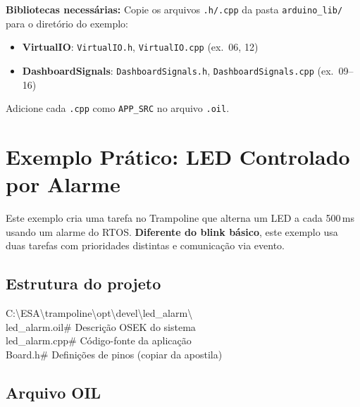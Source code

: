 \documentclass[12pt,a4paper]{article}
\begin{document}
\textbf{Bibliotecas necessárias:} Copie os arquivos \texttt{.h/.cpp} da pasta \texttt{arduino\_lib/} para o diretório do exemplo:
\begin{itemize}[nosep]
  \item \textbf{VirtualIO}: \texttt{VirtualIO.h}, \texttt{VirtualIO.cpp} (ex.~06, 12)
  \item \textbf{DashboardSignals}: \texttt{DashboardSignals.h}, \texttt{DashboardSignals.cpp} (ex.~09--16)
\end{itemize}
Adicione cada \texttt{.cpp} como \texttt{APP\_SRC} no arquivo \texttt{.oil}.

\section{Exemplo Prático: LED Controlado por Alarme}

Este exemplo cria uma tarefa no Trampoline que alterna um LED a cada 500\,ms usando um alarme do RTOS. \textbf{Diferente do blink básico}, este exemplo usa duas tarefas com prioridades distintas e comunicação via evento.

\subsection{Estrutura do projeto}

\begin{codigobox}
C:\textbackslash ESA\textbackslash trampoline\textbackslash opt\textbackslash devel\textbackslash led\_alarm\textbackslash\\
\quad led\_alarm.oil\quad\# Descrição OSEK do sistema\\
\quad led\_alarm.cpp\quad\# Código-fonte da aplicação\\
\quad Board.h\quad\quad\quad\quad\# Definições de pinos (copiar da apostila)
\end{codigobox}

\subsection{Arquivo OIL}
\end{document}
